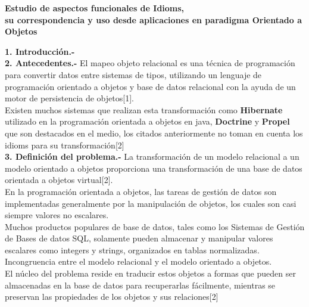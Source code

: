 
%
%
%

\begin{center}
\textbf{Estudio de aspectos funcionales de Idioms,}
 \\ \textbf{su correspondencia y uso desde aplicaciones en paradigma Orientado a Objetos}
\end{center}

\begin{flushleft}

\textbf{1. Introducción.-}
\\
\textbf{2. Antecedentes.-}
\textrm{El mapeo objeto relacional es una técnica de programación para convertir datos entre sistemas de tipos, utilizando un lenguaje de programación orientado a objetos y base de datos relacional con la ayuda de un motor de persistencia de objetos{[}1{]}.
\\
\textrm{Existen muchos sistemas que realizan esta transformación como \textbf{Hibernate} utilizado en la programación orientada a objetos en java, \textbf{Doctrine} y \textbf{Propel} que son destacados en el medio, los citados anteriormente no toman en cuenta los idioms para su transformación{[}2{]}} }\\
\textbf{3. Definición del problema.-}
\textrm{La transformación de un modelo relacional a un modelo orientado a objetos proporciona una transformación de una base de datos orientada a objetos virtual{[}2{]}.}
\\
\textrm{En la programación orientada a objetos, las tareas de gestión de datos son implementadas generalmente por la manipulación de objetos, los cuales son casi siempre valores no escalares.}
\\
\textrm{Muchos productos populares de base de datos, tales como los Sistemas de Gestión de Bases de datos SQL, solamente pueden almacenar y manipular valores escalares como integers y strings, organizados en tablas normalizadas.
\\
Incongruencia entre el modelo relacional y el modelo orientado a objetos.
\\
El núcleo del problema reside en traducir estos objetos a formas que pueden ser almacenadas en la base de datos para recuperarlas fácilmente, mientras se preservan las propiedades de los objetos y sus relaciones{[}2{]}
}


\end{flushleft}
